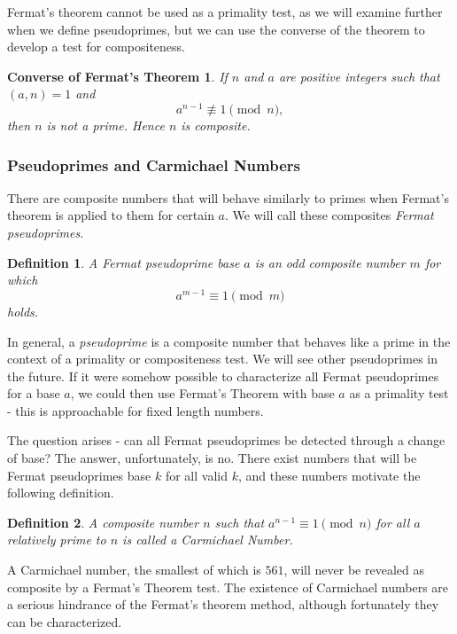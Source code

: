 \documentclass{article}
\newtheorem*{definition}{Definition}
\begin{document}
\par Fermat's theorem cannot be used as a primality test, as we will examine further when we define pseudoprimes, but we can use the converse of the theorem to develop a test for compositeness.

\newtheorem*{fermatconverse}{Converse of Fermat's Theorem}
\begin{fermatconverse}
If $n$ and $a$ are positive integers such that $(a,n) = 1$ and
	$$a^{n-1} \not\equiv 1 \pmod n,$$
	then $n$ is not a prime. Hence $n$ is composite.
\end{fermatconverse}

\subsubsection*{ Pseudoprimes and Carmichael Numbers }
There are composite numbers that will behave similarly to primes when Fermat's theorem is applied to them for certain $a$. We will call these composites \textit{Fermat pseudoprimes}.
\begin{definition}
A \textit{ Fermat pseudoprime} base $a$ is an odd composite number $m$ for which 
$$ a^{m-1} \equiv 1 \pmod m$$  
holds. 
\end{definition}

 \par In general, a \textit{pseudoprime} is a composite number that behaves like a prime in the context of a primality or compositeness test. We will see other pseudoprimes in the future. If it were somehow possible to characterize all Fermat pseudoprimes for a base $a$, we could then use Fermat's Theorem with base $a$ as a primality test - this is approachable for fixed length numbers.
 
 \par The question arises - can all Fermat pseudoprimes be detected through a change of base? The answer, unfortunately, is no.   There exist numbers that will be Fermat pseudoprimes base $k$ for all valid $k$, and these numbers motivate the following definition.
 
 \begin{definition}
  A composite number $n$ such that $a^{n -1} \equiv 1 \pmod n$ for all $a$ relatively prime to $n$ is called a \textit{Carmichael Number}.
 \end{definition}
 
 A Carmichael number, the smallest of which is $561$, will never be revealed as composite by a Fermat's Theorem test. The existence of Carmichael numbers are a serious hindrance of the Fermat's theorem method, although fortunately they can be characterized.
\end{document}
